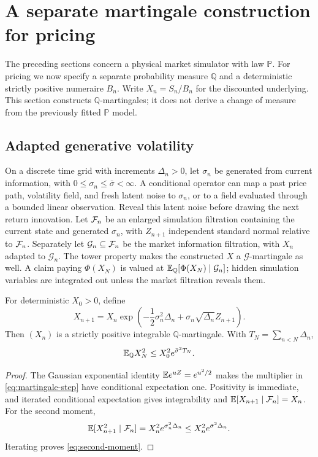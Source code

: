 \section{A separate martingale construction for pricing}\label{sec:pricing}
The preceding sections concern a physical market simulator with law $\mathbb P$.
For pricing we now specify a separate probability measure $\mathbb Q$ and a deterministic strictly positive numeraire $B_n$. Write $X_n=S_n/B_n$ for the discounted underlying. This section constructs $\mathbb Q$-martingales; it does not derive a change of measure from the previously fitted $\mathbb P$ model.

\subsection{Adapted generative volatility}
On a discrete time grid with increments $\Delta_n>0$, let $\sigma_n$ be generated from current information, with
$0\le\sigma_n\le\bar\sigma<\infty$. A conditional operator can map a past price path, volatility field, and fresh latent noise to $\sigma_n$, or to a field evaluated through a bounded linear observation. Reveal this latent noise before drawing the next return innovation. Let $\mathcal F_n$ be an enlarged simulation filtration containing the current state and generated $\sigma_n$, with $Z_{n+1}$ independent standard normal relative to $\mathcal F_n$. Separately let $\mathcal G_n\subseteq\mathcal F_n$ be the market information filtration, with $X_n$ adapted to $\mathcal G_n$. The tower property makes the constructed $X$ a $\mathcal G$-martingale as well. A claim paying $\Phi(X_N)$ is valued at $\mathbb E_{\mathbb Q}[\Phi(X_N)\mid\mathcal G_n]$; hidden simulation variables are integrated out unless the market filtration reveals them.

\begin{theorem}\label{thm:martingale}
For deterministic $X_0>0$, define
\begin{equation}\label{eq:martingale-step}
 X_{n+1}=X_n\exp\left(-\frac12\sigma_n^2\Delta_n+
                              \sigma_n\sqrt{\Delta_n}Z_{n+1}\right).
\end{equation}
Then $(X_n)$ is a strictly positive integrable $\mathbb Q$-martingale. With
$T_N=\sum_{n<N}\Delta_n$,
\begin{equation}\label{eq:second-moment}
 \mathbb E_\mathbb QX_N^2\le X_0^2e^{\bar\sigma^2T_N}.
\end{equation}
\end{theorem}
\begin{proof}
The Gaussian exponential identity
$\mathbb E e^{uZ}=e^{u^2/2}$ makes the multiplier in \eqref{eq:martingale-step} have conditional expectation one. Positivity is immediate, and iterated conditional expectation gives integrability and $\mathbb E[X_{n+1}\mid\mathcal F_n]=X_n$. For the second moment,
\[
 \mathbb E[X_{n+1}^2\mid\mathcal F_n]=X_n^2e^{\sigma_n^2\Delta_n}
 \le X_n^2e^{\bar\sigma^2\Delta_n}.
\]
Iterating proves \eqref{eq:second-moment}.
\end{proof}

